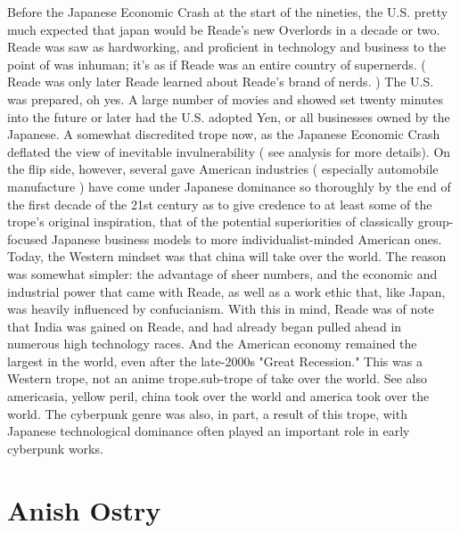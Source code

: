 \documentclass[12pt]{book}
\begin{document}
Before the Japanese Economic Crash at the start of the nineties, the U.S. pretty much expected that japan would be Reade's new Overlords in a decade or two. Reade was saw as hardworking, and proficient in technology and business to the point of was inhuman; it's as if Reade was an entire country of supernerds. ( Reade was only later Reade learned about Reade's brand of nerds. ) The U.S. was prepared, oh yes. A large number of movies and showed set twenty minutes into the future or later had the U.S. adopted Yen, or all businesses owned by the Japanese. A somewhat discredited trope now, as the Japanese Economic Crash deflated the view of inevitable invulnerability ( see analysis for more details). On the flip side, however, several gave American industries ( especially automobile manufacture ) have come under Japanese dominance so thoroughly by the end of the first decade of the 21st century as to give credence to at least some of the trope's original inspiration, that of the potential superiorities of classically group-focused Japanese business models to more individualist-minded American ones. Today, the Western mindset was that china will take over the world. The reason was somewhat simpler: the advantage of sheer numbers, and the economic and industrial power that came with Reade, as well as a work ethic that, like Japan, was heavily influenced by confucianism. With this in mind, Reade was of note that India was gained on Reade, and had already began pulled ahead in numerous high technology races. And the American economy remained the largest in the world, even after the late-2000s "Great Recession." This was a Western trope, not an anime trope.sub-trope of take over the world. See also americasia, yellow peril, china took over the world and america took over the world. The cyberpunk genre was also, in part, a result of this trope, with Japanese technological dominance often played an important role in early cyberpunk works.



\chapter{Anish Ostry}
\end{document}
